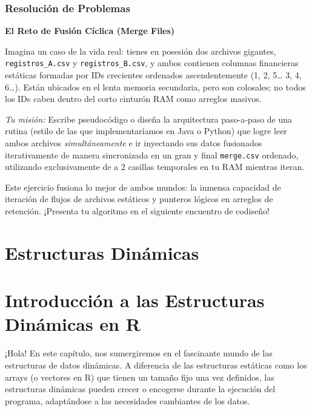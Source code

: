 \documentclass[
  spanish,
  letterpaper,
  DIV=11,
  numbers=noendperiod]{scrreprt}
\begin{document}
\subsection{Resolución de Problemas}\label{resoluciuxf3n-de-problemas}

\textbf{El Reto de Fusión Cíclica (Merge Files)}

Imagina un caso de la vida real: tienes en posesión dos archivos
gigantes, \texttt{registros\_A.csv} y \texttt{registros\_B.csv}, y ambos
contienen columnas financieras estáticas formadas por IDs crecientes
ordenados ascendentemente (1, 2, 5\ldots{} \textbar{} 3, 4, 6\ldots).
Están ubicados en el lenta memoria secundaria, pero son colosales; no
todos los IDs caben dentro del corto cinturón RAM como arreglos masivos.

\emph{Tu misión:} Escribe pseudocódigo o diseña la arquitectura
paso-a-paso de una rutina (estilo de las que implementaríamos en Java o
Python) que logre leer ambos archivos \emph{simultáneamente} e ir
inyectando sus datos fusionados iterativamente de manera sincronizada en
un gran y final \texttt{merge.csv} ordenado, utilizando exclusivamente
de a 2 casillas temporales en tu RAM mientras iteran.

Este ejercicio fusiona lo mejor de ambos mundos: la inmensa capacidad de
iteración de flujos de archivos estáticos y punteros lógicos en arreglos
de retención. ¡Presenta tu algoritmo en el siguiente encuentro de
codiseño!


\chapter{Estructuras Dinámicas}\label{estructuras-dinuxe1micas}


\chapter{Introducción a las Estructuras Dinámicas en
R}\label{introducciuxf3n-a-las-estructuras-dinuxe1micas-en-r}

¡Hola! En este capítulo, nos sumergiremos en el fascinante mundo de las
estructuras de datos dinámicas. A diferencia de las estructuras
estáticas como los arrays (o vectores en R) que tienen un tamaño fijo
una vez definidos, las estructuras dinámicas pueden crecer o encogerse
durante la ejecución del programa, adaptándose a las necesidades
cambiantes de los datos.
\end{document}
